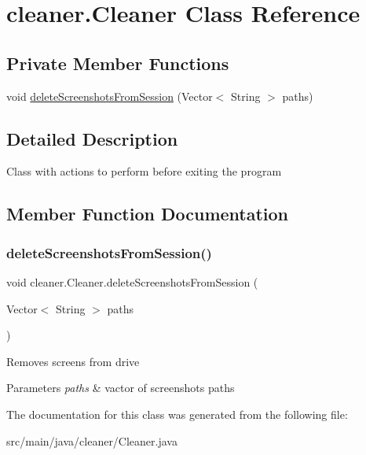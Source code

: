 \hypertarget{classcleaner_1_1_cleaner}{}\section{cleaner.\+Cleaner Class Reference}
\label{classcleaner_1_1_cleaner}
\subsection*{Private Member Functions}
\begin{DoxyCompactItemize}
\item 
void \hyperlink{classcleaner_1_1_cleaner_ad109bd7e5401ee0371a5e2e1d80acff8}{delete\+Screenshots\+From\+Session} (Vector$<$ String $>$ paths)
\end{DoxyCompactItemize}


\subsection{Detailed Description}
Class with actions to perform before exiting the program 

\subsection{Member Function Documentation}
\mbox{\label{classcleaner_1_1_cleaner_ad109bd7e5401ee0371a5e2e1d80acff8}} 
\subsubsection{\texorpdfstring{delete\+Screenshots\+From\+Session()}{deleteScreenshotsFromSession()}}
{\footnotesize\ttfamily void cleaner.\+Cleaner.\+delete\+Screenshots\+From\+Session (\begin{DoxyParamCaption}\item[{Vector$<$ String $>$}]{paths }\end{DoxyParamCaption})\hspace{0.3cm}{\ttfamily [private]}}

Removes screens from drive 
\begin{DoxyParams}{Parameters}
{\em paths} & vactor of screenshots\textquotesingle{} paths \\
\hline
\end{DoxyParams}


The documentation for this class was generated from the following file\+:\begin{DoxyCompactItemize}
\item 
src/main/java/cleaner/Cleaner.\+java\end{DoxyCompactItemize}

